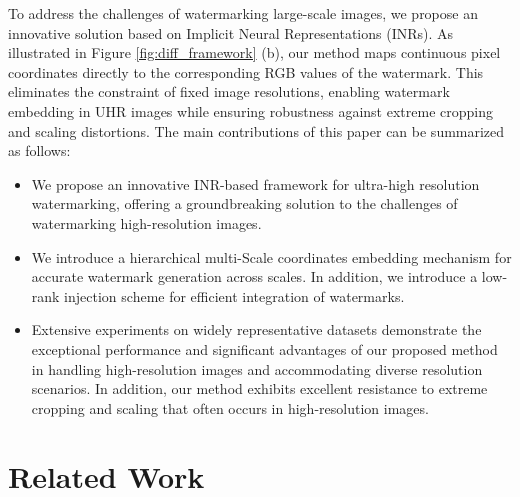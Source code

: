 \documentclass{article}
\begin{document}
To address the challenges of watermarking large-scale images, we propose an innovative solution based on Implicit Neural Representations (INRs). As illustrated in Figure \ref{fig:diff_framework} (b), our method maps continuous pixel coordinates directly to the corresponding RGB values of the watermark.
This eliminates the constraint of fixed image resolutions, enabling watermark embedding in UHR images while ensuring robustness against extreme cropping and scaling distortions.
The main contributions of this paper can be summarized as follows:
\begin{itemize}
    \item We propose an innovative INR-based framework for ultra-high resolution watermarking, offering a groundbreaking solution to the challenges of watermarking high-resolution images.
    \item We introduce a hierarchical multi-Scale coordinates embedding mechanism for accurate watermark generation across scales. In addition, we introduce a low-rank injection scheme for efficient integration of watermarks.
    \item Extensive experiments on widely representative datasets demonstrate the exceptional performance and significant advantages of our proposed method in handling high-resolution images and accommodating diverse resolution scenarios. In addition, our method exhibits excellent resistance to extreme cropping and scaling that often occurs in high-resolution images.
\end{itemize}



\section{Related Work}
\end{document}
